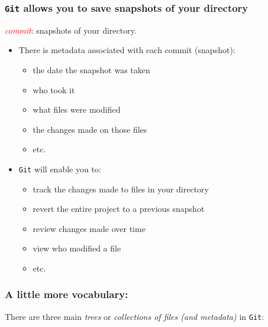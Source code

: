 \documentclass{beamer}
\begin{document}
\begin{frame}
\frametitle{\texttt{Git} allows you to save snapshots of your directory}
\textit{\textcolor{red}{commit}}: snapshots of your directory. \pause
\begin{itemize}
\item There is metadata associated with each commit (snapshot): 
\begin{itemize}
\item the date the snapshot was taken
\item who took it
\item what files were modified
\item the changes made on those files
\item etc. 
\end{itemize}\pause
\item \texttt{Git} will enable you to:
\begin{itemize}
\item track the changes made to files in your directory
\item revert the entire project to a previous snapshot
\item review changes made over time
\item view who modified a file
\item etc. 
\end{itemize}
\end{itemize}
\end{frame}

\begin{frame}
\frametitle{A little more vocabulary:}
There are three main \textit{trees} or \textit{collections of files (and metadata)} in \texttt{Git}:
\begin{center}
\end{center}
\end{frame}
\end{document}
